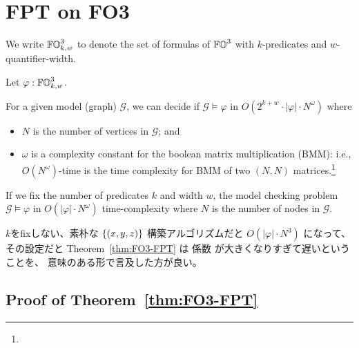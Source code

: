 
\section{FPT on FO3}

We write $\mathbb{FO}^3_{k, w}$ to denote the set of formulas of $\mathbb{FO}^3$ with $k$-predicates and $w$-quantifier-width.

\begin{theorem}
\label{thm:FO3-FPT}
\mbox{}

Let $\varphi : \mathbb{FO}^3_{k, w}$.

For a given model (graph) $\mathcal{G}$,
we can decide if $\mathcal{G} \models \varphi$ in $O(2^{k + w} \cdot |\varphi| \cdot N^{\omega})$ where
\begin{itemize}
\item $N$ is the number of vertices in $\mathcal{G}$; and
\item $\omega$ is a complexity constant for the boolean matrix multiplication (BMM): i.e., $O(N^\omega)$-time is the time complexity for BMM of two $(N, N)$ matrices.\footnote{}
\end{itemize}
\end{theorem}

\begin{corollary}
If we fix the number of predicates $k$ and width $w$,
the model checking problem $\mathcal{G} \models \varphi$ in $O(|\varphi| \cdot N^{\omega})$ time-complexity where $N$ is the number of nodes in $\mathcal{G}$.
\end{corollary}

\begin{Jcomment}
    $k$をfixしない、素朴な $\{ (x, y, z) \}$ 構築アルゴリズムだと $O(|\varphi| \cdot N^3)$ になって、
    その設定だと Theorem~\ref{thm:FO3-FPT} は 係数 が大きくなりすぎて遅いということを、
    意味のある形で言及した方が良い。
\end{Jcomment}


\subsection{Proof of Theorem~\ref{thm:FO3-FPT}}

